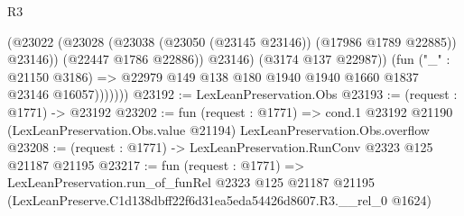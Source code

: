 \begin{lexlean}{R3}
\begin{coremodule}
                      (@23022
                        (@23028 (@23038 (@23050 (@23145 @23146)) (@17986 @1789 @22885)) @23146))
                      (@22447 @1786 @22886))
                    @23146)
                  (@3174 @137 @22987))
                (fun ("_" : @21150 @3186) =>
                @22979 @149 @138 @180 @1940 @1940 @1660 @1837 @23146 @16057)))))))
@23192 := LexLeanPreservation.Obs
@23193 := (request : @1771) -> @23192
@23202 := fun (request : @1771) =>
  cond.{1} @23192 @21190 (LexLeanPreservation.Obs.value @21194) LexLeanPreservation.Obs.overflow
@23208 := (request : @1771) -> LexLeanPreservation.RunConv @2323 @125 @21187 @21195
@23217 := fun (request : @1771) =>
  LexLeanPreservation.run_of_funRel
    @2323
    @125
    @21187
    @21195
    (LexLeanPreserve.C1d138dbff22f6d31ea5eda54426d8607.R3.__rel_0 @1624)
\end{coremodule}
\end{lexlean}
